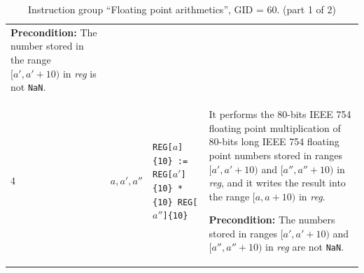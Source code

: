 \documentclass[10pt,twocolumn]{article}
\begin{document}
\begin{table}[!h]
\begin{center}
\begin{tabular}{lp{1.2cm}p{5.5cm}p{7.5cm}}
\textbf{Precondition:} The number stored in the range $ [a',a'+10) $ in
\textit{reg} is not \texttt{NaN}. \\

4 & $ a,a',a'' $ %
& \texttt{REG[}$ a $\texttt{]\{10\} := REG[}$ a' $\texttt{]\{10\} *\{10\} REG[}$
a'' $\texttt{]\{10\}} %
& It performs the $ 80 $-bits IEEE 754 floating point multiplication of $ 80 $-bits
long IEEE 754 floating point numbers stored in ranges $ [a',a'+10) $ and $
[a'',a''+10) $ in \textit{reg}, and it writes the result into the range $
[a,a+10) $ in \textit{reg}.

\textbf{Precondition:} The numbers stored in ranges $ [a',a'+10) $ and $
[a'',a''+10) $  in \textit{reg} are not \texttt{NaN}. \\

\end{tabular}
\end{center}
\caption{Instruction group ``Floating point arithmetics'', GID = 60. (part 1 of 2)}
\label{tab:igroup:fparithmetics}
\end{table}

\clearpage
\end{document}

